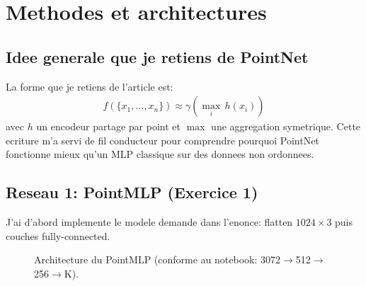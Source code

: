 \chapter{Methodes et architectures}

\section{Idee generale que je retiens de PointNet}
La forme que je retiens de l'article est:
\begin{align}
f(\{x_1, \dots, x_n\}) \approx \gamma\left(\max_i\, h(x_i)\right)
\end{align}
avec \(h\) un encodeur partage par point et \(\max\) une aggregation symetrique.
Cette ecriture m'a servi de fil conducteur pour comprendre pourquoi PointNet fonctionne mieux qu'un MLP classique sur des donnees non ordonnees.

\section{Reseau 1: PointMLP (Exercice 1)}
J'ai d'abord implemente le modele demande dans l'enonce: flatten \(1024\times 3\) puis couches fully-connected.

\begin{figure}[H]
\centering
{}
\caption{Architecture du PointMLP (conforme au notebook: 3072\(\rightarrow\)512\(\rightarrow\)256\(\rightarrow\)K).}
\label{fig:arch-mlp}
\end{figure}

